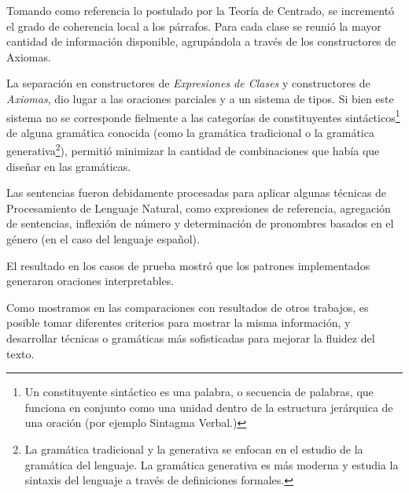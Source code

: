 Tomando como referencia lo postulado por la Teoría de Centrado, %
se incrementó el grado de coherencia local a los párrafos. Para cada clase se reunió la mayor cantidad de información disponible, agrupándola a través de los constructores de Axiomas.

La separación en constructores de \textit{Expresiones de Clases} y constructores de \textit{Axiomas}, dio lugar a las oraciones parciales y a un sistema de tipos. Si bien este sistema no se corresponde fielmente a las categorías de constituyentes sintácticos\footnote{Un constituyente sintáctico es una palabra, o secuencia de palabras, que funciona en conjunto como una unidad dentro de la estructura jerárquica de una oración (por ejemplo Sintagma Verbal.)} de alguna gramática conocida (como la gramática tradicional o la gramática generativa\footnote{La gramática tradicional y la generativa se enfocan en el estudio de la gramática del lenguaje. La gramática generativa es más moderna y estudia la sintaxis del lenguaje a través de definiciones formales.}), permitió minimizar la cantidad de combinaciones que había que diseñar en las gramáticas.

Las sentencias fueron debidamente procesadas para aplicar algunas técnicas de Procesamiento de Lenguaje Natural, como expresiones de referencia, agregación de sentencias, inflexión de número y determinación de pronombres basados en el género (en el caso del lenguaje español). 

El resultado en los casos de prueba mostró que los patrones implementados generaron oraciones interpretables.

Como mostramos en las comparaciones con resultados de otros trabajos, es posible tomar diferentes criterios para mostrar la misma información, y desarrollar técnicas o gramáticas más sofisticadas para mejorar la fluidez del texto.